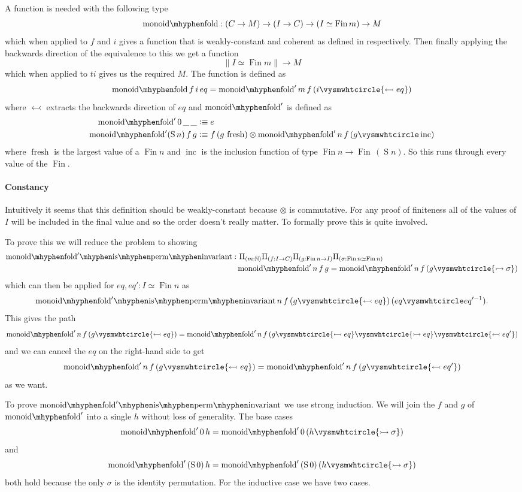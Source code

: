 \documentclass[12pt, parskip, DIV=14]{scrbook}
\newcommand{\defeq}{\vcentcolon\equiv}
\renewcommand{\circ}{\vysmwhtcircle}
\newcommand{\Fin}{\operatorname{Fin}}
\newcommand{\Suc}{\operatorname{S}}
\newcommand{\monfold}{\operatorname{monoid\mhyphen fold}}
\newcommand{\monfoldinv}{\operatorname{monoid\mhyphen fold}'\mkern-3mu\operatorname{\mhyphen is\mhyphen perm\mhyphen invariant}}
\newcommand{\fresh}{\operatorname{fresh}}
\newcommand{\inc}{\operatorname{inc}}
\begin{document}
A function is needed with the following type
$$\monfold : (C \to M) \to (I \to C) \to (I \simeq \Fin m) \to M$$
which when applied to $f$ and $i$ gives a function that is weakly-constant and coherent as defined in  respectively. Then finally applying the backwards direction of the equivalence to this we get a function $$\| I \simeq \Fin m\| \to M$$ which when applied to $ti$ gives us the required $M$. The function is defined as
$$\monfold f\,i\,eq = \monfold' m\,f \,(i \circ {\leftarrowtail eq})$$
 where $\leftarrowtail$ extracts the backwards direction of $eq$ and $\monfold'$ is defined as
\begin{align*}
  \monfold' 0\,\_\,\_ &\defeq e \\
  \monfold' (\Suc n)\,f\,g &\defeq f\,(g\,\fresh) \otimes \monfold' n\,f\,(g \circ \inc)
\end{align*}
where $\fresh$ is the largest value of a $\Fin n$ and $\inc$ is the inclusion function of type $\Fin n \to \Fin\,(\Suc n)$. So this runs through every value of the $\Fin$.

\paragraph{Constancy} Intuitively it seems that this definition should be weakly-constant because $\otimes$ is commutative. For any proof of finiteness all of the values of $I$ will be included in the final value and so the order doesn't really matter. To formally prove this is quite involved.

To prove this we will reduce the problem to showing
\begin{align*}
  \monfoldinv : &~\Pi_{(m : \mathbb{N})}\Pi_{(f : I \to C)}\Pi_{(g : \Fin n \to I)}\Pi_{(\sigma : \Fin n \simeq \Fin n)} \\
  & \monfold' n\,f\,g = \monfold' n\,f\,(g \circ {\rightarrowtail \sigma})
\end{align*}
which can then be applied for $eq , eq' : I \simeq \Fin n$ as
$$\monfoldinv n\,f\,(g \circ {\leftarrowtail eq})\,(eq \circ eq'^{-1}).$$
This gives the path
$$\monfold' n\,f\,(g \circ {\leftarrowtail eq}) = \monfold' n\,f\,(g \circ {\leftarrowtail eq} \circ {\rightarrowtail eq} \circ {\leftarrowtail eq'})$$
and we can cancel the $eq$ on the right-hand side to get
$$\monfold' n\,f\,(g \circ {\leftarrowtail eq}) = \monfold' n\,f\,(g \circ {\leftarrowtail eq'})$$
as we want.

To prove $\monfoldinv$ we use strong induction. We will join the $f$ and $g$ of $\monfold'$ into a single $h$ without loss of generality. The base cases
$$\monfold' 0\,h = \monfold' 0\,(h \circ {\rightarrowtail \sigma})$$
and
$$\monfold'\,(\Suc 0)\,h = \monfold'\,(\Suc 0)\,(h \circ {\rightarrowtail \sigma})$$
both hold because the only $\sigma$ is the identity permutation. For the inductive case we have two cases.
\end{document}
